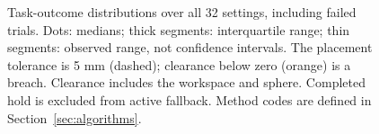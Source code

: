 \begin{figure}[t]
\caption{Task-outcome distributions over all 32 settings, including failed trials. Dots: medians; thick segments: interquartile range; thin segments: observed range, not confidence intervals. The placement tolerance is 5 mm (dashed); clearance below zero (orange) is a breach. Clearance includes the workspace and sphere. Completed hold is excluded from active fallback. Method codes are defined in Section~\ref{sec:algorithms}.}\label{fig:distributions}
\end{figure}

